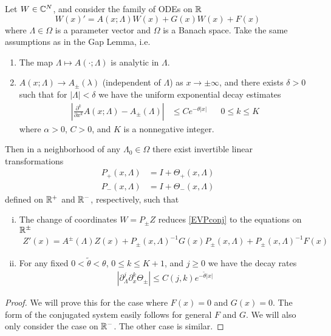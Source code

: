 \documentclass[thesis.tex]{subfiles}
\begin{document}
\begin{lemma}
Let $W \in \mathbb{C}^N$, and consider the family of ODEs on $\mathbb{R}$
\begin{equation}\label{EVPconj}
W(x)' = A(x; \Lambda) W(x) + G(x)W(x) + F(x)
\end{equation}
where $\Lambda \in \Omega$ is a parameter vector and $\Omega$ is a Banach space. Take the same assumptions as in the Gap Lemma, i.e. 
\begin{enumerate}
	\item The map $\Lambda \mapsto A(\cdot; \Lambda)$ is analytic in $\Lambda$.
	\item $A(x; \Lambda) \rightarrow A_\pm(\lambda)$ (independent of $\Lambda$) as $x \rightarrow \pm \infty$, and there exists $\delta > 0$ such that for $|\Lambda| < \delta$ we have the uniform exponential decay estimates 
	\begin{align}
	\left| \frac{\partial^k}{\partial x^k} A(x; \Lambda) - A_\pm(\Lambda) \right| 
	&\leq C e^{-\theta |x|} && 0 \leq k \leq K
	\end{align}
	where $\alpha > 0$, $C > 0$, and $K$ is a nonnegative integer.
\end{enumerate}
Then in a neighborhood of any $\Lambda_0 \in \Omega$ there exist invertible linear transformations
\begin{equation}\label{conjlemmaP}
\begin{aligned}
P_+(x, \Lambda) &= I + \Theta_+(x, \Lambda) \\
P_-(x, \Lambda) &= I + \Theta_-(x, \Lambda) 
\end{aligned}
\end{equation}
defined on $\mathbb{R}^+$ and $\mathbb{R}^-$, respectively, such that
\begin{enumerate}[(i)]
\item The change of coordinates $W = P_\pm Z$ reduces \eqref{EVPconj} to the equations on $\mathbb{R}^\pm$
\begin{align}\label{conjZ}
Z'(x) = A^\pm(\Lambda) Z(x) + P_\pm(x, \Lambda)^{-1} G(x) P_\pm(x, \Lambda) + P_\pm(x, \Lambda)^{-1} F(x)
\end{align}

\item For any fixed $0 < \tilde{\theta} < \theta$, $0 \leq k \leq K+1$, and $j \geq 0$ we have the decay rates
\begin{align}\label{conjthetadecay}
\left| \partial_\Lambda^j \partial_x^k \Theta_\pm \right| \leq C(j, k)e^{-\tilde{\theta}|x|}
\end{align}
\end{enumerate}
\begin{proof}
We will prove this for the case where $F(x) = 0$ and $G(x) = 0$. The form of the conjugated system easily follows for general $F$ and $G$. We will also only consider the case on $\mathbb{R}^-$. The other case is similar. 


\end{proof}
\end{lemma}
\end{document}
